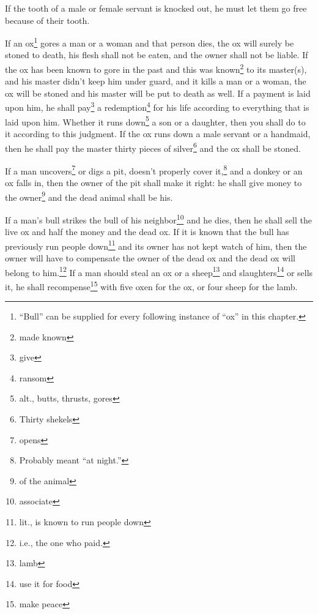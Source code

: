 \begin{inparaenum}
     If the tooth of a male or female servant is knocked out, he must let them go free because of their tooth.%
    
     If an ox\footnote{``Bull'' can be supplied for every following instance of ``ox'' in this chapter.} gores a man or a woman and that person dies, the ox will surely be stoned to death, his flesh shall not be eaten, and the owner shall not be liable.%
     If the ox has been known to gore in the past and this was known\footnote{made known} to its master(s), and his master didn't keep him under guard, and it kills a man or a woman, the ox will be stoned and his master will be put to death as well.%
     If a payment is laid upon him, he shall pay\footnote{give} a redemption\footnote{ransom} for his life according to everything that is laid upon him.%
     Whether it runs down\footnote{alt., butts, thrusts, gores} a son or a daughter, then you shall do to it according to this judgment.%
     If the ox runs down a male servant or a handmaid, then he shall pay the master thirty pieces of silver\footnote{Thirty shekels} and the ox shall be stoned.%
    
     If a man uncovers\footnote{opens} or digs a pit, doesn't properly cover it,\footnote{Probably meant ``at night.''} and a donkey or an ox falls in,%
     then the owner of the pit shall make it right: he shall give money to the owner\footnote{of the animal} and the dead animal shall be his.%
    
     If a man's bull strikes the bull of his neighbor\footnote{associate} and he dies, then he shall sell the live ox and half the money and the dead ox.%
     If it is known that the bull has previously run people down\footnote{lit., is known to run people down} and its owner has not kept watch of him, then the owner will have to compensate the owner of the dead ox and the dead ox will belong to him.\footnote{i.e., the one who paid.}%
     If a man should steal an ox or a sheep\footnote{lamb} and slaughters\footnote{use it for food} or sells it, he shall recompense\footnote{make peace} with five oxen for the ox, or four sheep for the lamb.%
\end{inparaenum}
